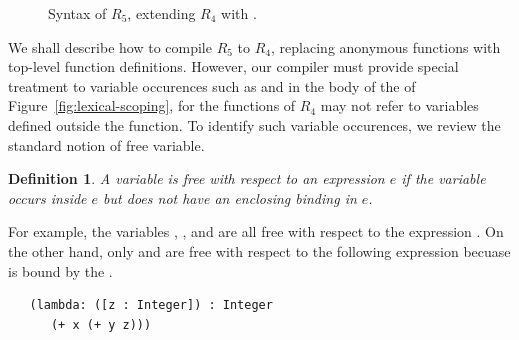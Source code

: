 \documentclass[11pt]{book}
\newcommand{\gray}[1]{{\color{lightgray} #1}}
\newtheorem{definition}[theorem]{Definition}
\begin{document}
\begin{figure}[tp]
\centering
\fbox{
\begin{minipage}{0.96\textwidth}
\[
\begin{array}{lcl}
  \Type &::=& \gray{\key{Integer} \mid \key{Boolean}
     \mid (\key{Vector}\;\Type^{+}) \mid \key{Void}
     \mid (\Type^{*} \; \key{->}\; \Type)} \\
  \Exp &::=& \gray{\Int \mid (\key{read}) \mid (\key{-}\;\Exp)
     \mid (\key{+} \; \Exp\;\Exp)}  \\
    &\mid&  \gray{\Var \mid \LET{\Var}{\Exp}{\Exp}
     \mid \key{\#t} \mid \key{\#f} \mid
           (\key{and}\;\Exp\;\Exp) \mid (\key{not}\;\Exp)} \\
    &\mid& \gray{(\key{eq?}\;\Exp\;\Exp) \mid \IF{\Exp}{\Exp}{\Exp}} \\
    &\mid& \gray{(\key{vector}\;\Exp^{+}) \mid
          (\key{vector-ref}\;\Exp\;\Int)} \\
    &\mid& \gray{(\key{vector-set!}\;\Exp\;\Int\;\Exp)\mid (\key{void})} \\
    &\mid& \gray{(\Exp \; \Exp^{*})} \\
    &\mid& (\key{lambda:}\; ([\Var \key{:} \Type]^{*}) \key{:} \Type \; \Exp) \\
  \Def &::=& \gray{(\key{define}\; (\Var \; [\Var \key{:} \Type]^{*}) \key{:} \Type \; \Exp)} \\
  R_5 &::=& \gray{(\key{program} \; \Def^{*} \; \Exp)}
\end{array}
\]
\end{minipage}
}
\caption{Syntax of $R_5$, extending $R_4$ with .}
\label{fig:r5-syntax}
\end{figure}

We shall describe how to compile $R_5$ to $R_4$, replacing anonymous
functions with top-level function definitions.  However, our compiler
must provide special treatment to variable occurences such as 
and  in the body of the  of
Figure~\ref{fig:lexical-scoping}, for the functions of $R_4$ may not
refer to variables defined outside the function. To identify such
variable occurences, we review the standard notion of free variable.

\begin{definition}
A variable is \emph{free with respect to an expression} $e$ if the
variable occurs inside $e$ but does not have an enclosing binding in
$e$.
\end{definition}

For example, the variables , , and  are all
free with respect to the expression .  On the
other hand, only  and  are free with respect to the
following expression becuase  is bound by the .
\begin{lstlisting}
   (lambda: ([z : Integer]) : Integer
      (+ x (+ y z)))
\end{lstlisting}
\end{document}
